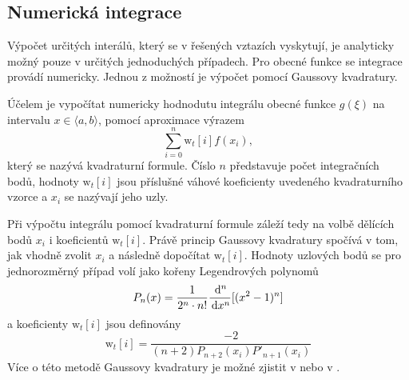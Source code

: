 \subsection{Numerická integrace}
Výpočet určitých interálů, který se v řešených vztazích vyskytují, je analyticky možný pouze v určitých jednoduchých případech. Pro obecné funkce se integrace provádí numericky. Jednou z možností je výpočet pomocí Gaussovy kvadratury.

Účelem je vypočítat numericky hodnodutu integrálu obecné funkce $g(\xi)$ na intervalu $x\in\langle a, b\rangle$,  pomocí aproximace výrazem
\begin{displaymath}
\sum_{i=0}^{n}\mathrm{w}_{t}[i]f(x_{i}),
\end{displaymath}
který se nazývá kvadraturní formule. Číslo $n$ představuje počet integračních bodů, hodnoty $\mathrm{w}_{t}[i]$ jsou příslušné váhové koeficienty uvedeného kvadraturního vzorce a $x_{i}$ se nazývají jeho uzly. 

Při výpočtu integrálu pomocí kvadraturní formule záleží tedy na volbě dělících bodů $x_{i}$ i koeficientů $\mathrm{w}_{t}[i]$. Právě princip Gaussovy kvadratury spočívá v tom, jak vhodně zvolit $x_{i}$ a následně dopočítat $\mathrm{w}_{t}[i]$. Hodnoty uzlových bodů se pro jednorozměrný případ volí jako kořeny Legendrových polynomů
\begin{displaymath}
	P_{n}(x) = \frac{1}{2^{n}\cdot n!}\frac{\,\mathrm{d}^{n}}{\,\mathrm{d} x^{n}}[(x^{2} - 1)^{n}]
\end{displaymath}
a koeficienty $\mathrm{w}_{t}[i]$ jsou definovány
\begin{displaymath}
\mathrm{w}_{t}[i] = \frac{-2}{(n+2)P_{n+2}(x_i)P'_{n+1}(x_i)}
\end{displaymath}
Více o této metodě Gaussovy kvadratury je možné zjistit v \cite{gk_tichy} nebo v \cite{gk_kaw}.

